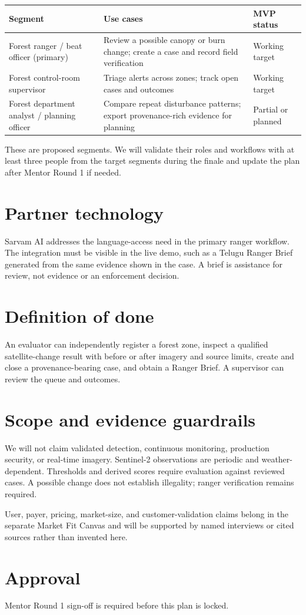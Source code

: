 \documentclass{article}
\begin{document}
\begin{tabularx}{\textwidth}{|>{\raggedright\arraybackslash}X|>{\raggedright\arraybackslash}X|>{\raggedright\arraybackslash}p{}|}
\hline
Segment & Use cases & MVP status \\
\hline
Forest ranger / beat officer (primary) & Review a possible canopy or burn change; create a case and record field verification & Working target \\
\hline
Forest control-room supervisor & Triage alerts across zones; track open cases and outcomes & Working target \\
\hline
Forest department analyst / planning officer & Compare repeat disturbance patterns; export provenance-rich evidence for planning & Partial or planned \\
\hline
\end{tabularx}

These are proposed segments. We will validate their roles and workflows with at least three people from the target segments during the finale and update the plan after Mentor Round 1 if needed.

\section{Partner technology}

Sarvam AI addresses the language-access need in the primary ranger workflow. The integration must be visible in the live demo, such as a Telugu Ranger Brief generated from the same evidence shown in the case. A brief is assistance for review, not evidence or an enforcement decision.

\section{Definition of done}

An evaluator can independently register a forest zone, inspect a qualified satellite-change result with before or after imagery and source limits, create and close a provenance-bearing case, and obtain a Ranger Brief. A supervisor can review the queue and outcomes.

\section{Scope and evidence guardrails}

We will not claim validated detection, continuous monitoring, production security, or real-time imagery. Sentinel-2 observations are periodic and weather-dependent. Thresholds and derived scores require evaluation against reviewed cases. A possible change does not establish illegality; ranger verification remains required.

User, payer, pricing, market-size, and customer-validation claims belong in the separate Market Fit Canvas and will be supported by named interviews or cited sources rather than invented here.

\section{Approval}

Mentor Round 1 sign-off is required before this plan is locked.
\end{document}
